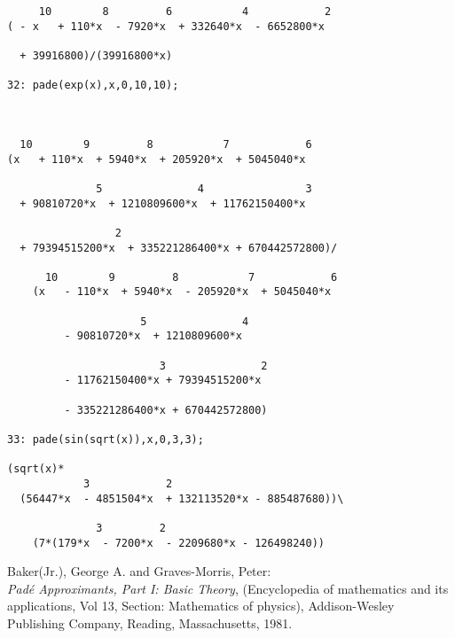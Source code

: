 \begin{verbatim}
     10        8         6           4            2
( - x   + 110*x  - 7920*x  + 332640*x  - 6652800*x

  + 39916800)/(39916800*x)

32: pade(exp(x),x,0,10,10);



  10        9         8           7            6
(x   + 110*x  + 5940*x  + 205920*x  + 5045040*x

              5               4                3
  + 90810720*x  + 1210809600*x  + 11762150400*x

                 2
  + 79394515200*x  + 335221286400*x + 670442572800)/

      10        9         8           7            6
    (x   - 110*x  + 5940*x  - 205920*x  + 5045040*x

                     5               4
         - 90810720*x  + 1210809600*x 

                        3               2
         - 11762150400*x + 79394515200*x  

         - 335221286400*x + 670442572800)

33: pade(sin(sqrt(x)),x,0,3,3);
        
(sqrt(x)*
            3            2
  (56447*x  - 4851504*x  + 132113520*x - 885487680))\

              3         2
    (7*(179*x  - 7200*x  - 2209680*x - 126498240))
\end{verbatim}


\begin{thebibliography}{9}
 Baker(Jr.), George A. and Graves-Morris, Peter:\\
{\it Pad\'{e} Approximants, Part I: Basic Theory},
(Encyclopedia of mathematics and its applications, Vol 13,
Section: Mathematics of physics),
Addison-Wesley Publishing Company, Reading, Massachusetts, 1981.
\end{thebibliography}
